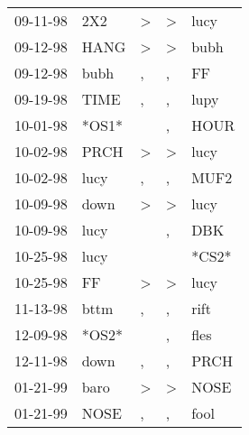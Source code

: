 \begin{supertabular}{p{0.07\textwidth}p{0.06\textwidth}p{0.02\textwidth}p{0.02\textwidth}p{0.06\textwidth}}
          09-11-98\textsuperscript{} &   2X2\textsuperscript{} &  \textgreater &     \textgreater &  lucy\textsuperscript{} \\
          09-12-98\textsuperscript{} &  HANG\textsuperscript{} &  \textgreater &     \textgreater &  bubh\textsuperscript{} \\
          09-12-98\textsuperscript{} &  bubh\textsuperscript{} &             , &                , &    FF\textsuperscript{} \\
          09-19-98\textsuperscript{} &  TIME\textsuperscript{} &             , &                , &  lupy\textsuperscript{} \\
          10-01-98\textsuperscript{} &                   *OS1* &               &                , &  HOUR\textsuperscript{} \\
          10-02-98\textsuperscript{} &  PRCH\textsuperscript{} &  \textgreater &     \textgreater &  lucy\textsuperscript{} \\
          10-02-98\textsuperscript{} &  lucy\textsuperscript{} &             , &                , &  MUF2\textsuperscript{} \\
          10-09-98\textsuperscript{} &  down\textsuperscript{} &  \textgreater &     \textgreater &  lucy\textsuperscript{} \\
          10-09-98\textsuperscript{} &  lucy\textsuperscript{} &               &                , &   DBK\textsuperscript{} \\
          10-25-98\textsuperscript{} &  lucy\textsuperscript{} &               &                  &                   *CS2* \\
          10-25-98\textsuperscript{} &    FF\textsuperscript{} &  \textgreater &     \textgreater &  lucy\textsuperscript{} \\
          11-13-98\textsuperscript{} &  bttm\textsuperscript{} &             , &                , &  rift\textsuperscript{} \\
          12-09-98\textsuperscript{} &                   *OS2* &               &                , &  fles\textsuperscript{} \\
          12-11-98\textsuperscript{} &  down\textsuperscript{} &             , &                , &  PRCH\textsuperscript{} \\
          01-21-99\textsuperscript{} &  baro\textsuperscript{} &  \textgreater &     \textgreater &  NOSE\textsuperscript{} \\
          01-21-99\textsuperscript{} &  NOSE\textsuperscript{} &             , &                , &  fool\textsuperscript{} \\

\end{supertabular}

